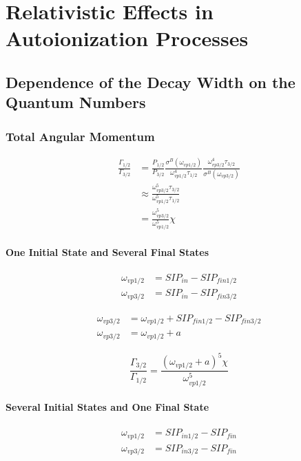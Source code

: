 \chapter{Relativistic Effects in Autoionization Processes}


\section{Dependence of the Decay Width on the Quantum Numbers}
\subsection{Total Angular Momentum}

\begin{align}
  \frac{\Gamma_{1/2}}{\Gamma_{3/2}}
  &= \frac{P_{1/2}}{P_{3/2}} \frac{\sigma^B(\omega_{vp1/2})}{\omega_{vp1/2}^4 \tau_{1/2}}
     \frac{\omega_{vp3/2}^4 \tau_{3/2}}{\sigma^B(\omega_{vp3/2})}          \\
  &\approx \frac{\omega_{vp3/2}^5 \tau_{3/2}}{\omega_{vp1/2}^5 \tau_{1/2}} \\
  &= \frac{\omega_{vp3/2}^5}{\omega_{vp1/2}^5}  \chi
\end{align}


\subsubsection{One Initial State and Several Final States}
\begin{align}
  \omega_{vp1/2} &= SIP_{in} - SIP_{fin1/2}  \\
  \omega_{vp3/2} &= SIP_{in} - SIP_{fin3/2} 
\end{align}

\begin{align}
  \omega_{vp3/2} &= \omega_{vp1/2} + SIP_{fin1/2} - SIP_{fin3/2} \\
  \omega_{vp3/2} &= \omega_{vp1/2} + a
\end{align}

\begin{equation}
  \frac{\Gamma_{3/2}}{\Gamma_{1/2}} = \frac{(\omega_{vp1/2} +a)^5 \chi}{\omega_{vp1/2}^5}
\end{equation}


\subsubsection{Several Initial States and One Final State}


\begin{align}
  \omega_{vp1/2} &= SIP_{in1/2} - SIP_{fin}  \\
  \omega_{vp3/2} &= SIP_{in3/2} - SIP_{fin} 
\end{align}


